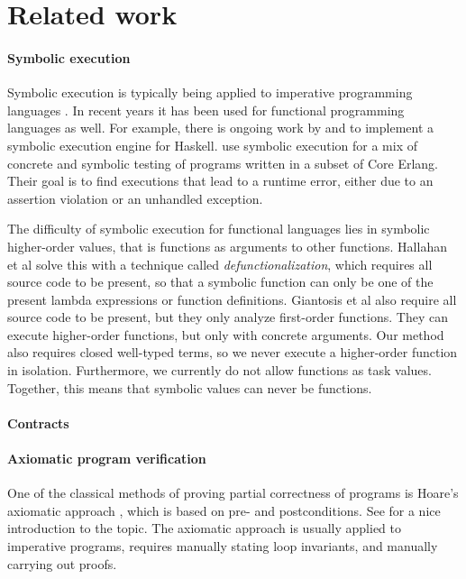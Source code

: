 


\section{Related work}
\label{sec:relatedwork}

\paragraph{Symbolic execution}
Symbolic execution \cite{King1975,Boyer1975} is typically being applied to imperative programming languages \cite{BucurKC2014} .
In recent years it has been used for functional programming languages as well.
For example, there is ongoing work by \citet{HallahanXP2017} and \citet{Xue2019} to implement a symbolic execution engine for Haskell.
\citet{GiantsiosPS2017} use symbolic execution for a mix of concrete and symbolic testing of programs written in a subset of Core Erlang.
Their goal is to find executions that lead to a runtime error, either due to an assertion violation or an unhandled exception.

The difficulty of symbolic execution for functional languages lies in symbolic higher-order values, that is functions as arguments to other functions.
Hallahan et al solve this with a technique called \emph{defunctionalization}, which requires all source code to be present, so that a symbolic function can only be one of the present lambda expressions or function definitions.
Giantosis et al also require all source code to be present, but they only analyze first-order functions.
They can execute higher-order functions, but only with concrete arguments.
Our method also requires closed well-typed terms, so we never execute a higher-order function in isolation.
Furthermore, we currently do not allow functions as task values.
Together, this means that symbolic values can never be functions.



\paragraph{Contracts}


\paragraph{Axiomatic program verification}
One of the classical methods of proving partial correctness of programs is Hoare's axiomatic approach \cite{Hoare1969}, which is based on pre- and postconditions.
See \citet{NielsonN1992} for a nice introduction to the topic.
The axiomatic approach is usually applied to imperative programs, requires manually stating loop invariants, and manually carrying out proofs.

